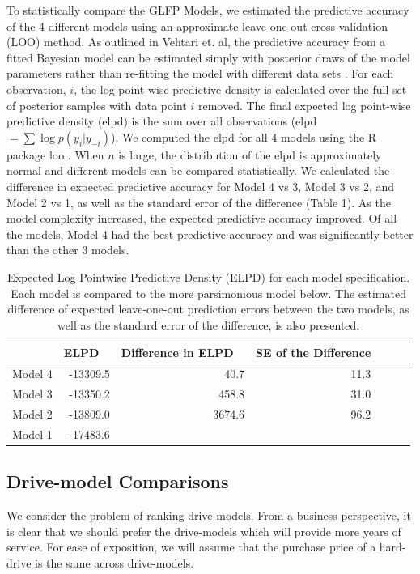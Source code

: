 \documentclass[12pt]{article}
\begin{document}
To statistically compare the GLFP Models, we estimated the predictive accuracy of the 4 different models using an approximate leave-one-out cross validation (LOO) method.  As outlined in Vehtari et. al, the predictive accuracy from a fitted Bayesian model can be estimated simply with posterior draws of the model parameters rather than re-fitting the model with different data sets \cite{vehtari}.  For each observation, $i$, the log point-wise predictive density is calculated over the full set of posterior samples with data point $i$ removed.  The final expected log point-wise predictive density (elpd) is the sum over all observations (elpd $=\sum{\log p(y_i|y_{-i})}$).  We computed the elpd for all 4 models using the R package loo \cite{loo}.  When $n$ is large, the distribution of the elpd is approximately normal and different models can be compared statistically.  We calculated the difference in expected predictive accuracy for Model 4 vs 3, Model 3 vs 2, and Model 2 vs 1, as well as the standard error of the difference (Table 1).  As the model complexity increased, the expected predictive accuracy improved.  Of all the models, Model 4 had the best predictive accuracy and was significantly better than the other 3 models.

\begin{table}[H]
\centering
\begin{tabular}{rrrrrrr}
  \hline
 & ELPD \ & Difference in ELPD \ & SE of the Difference \\ 
  \hline
Model 4 & -13309.5 & 40.7 & 11.3 \\ 
Model 3 & -13350.2 & 458.8 & 31.0  \\ 
Model 2 & -13809.0 & 3674.6 & 96.2 \\ 
Model 1 & -17483.6  \\ 
   \hline
\end{tabular}
\caption{Expected Log Pointwise Predictive Density (ELPD) for each model specification.  Each model is compared to the more parsimonious model below.  The estimated difference of expected leave-one-out prediction errors between the two models, as well as the standard error of the difference, is also presented.}
\label{table:1}
\end{table}


\subsection{Drive-model Comparisons}
\label{sec:Drive-model Comparisons}
We consider the problem of ranking drive-models. From a
business perspective, it is clear
that we should prefer the drive-models which will provide more years
of service. For ease of exposition, we will assume that the purchase
price of a hard-drive is the same across drive-models.
\end{document}
